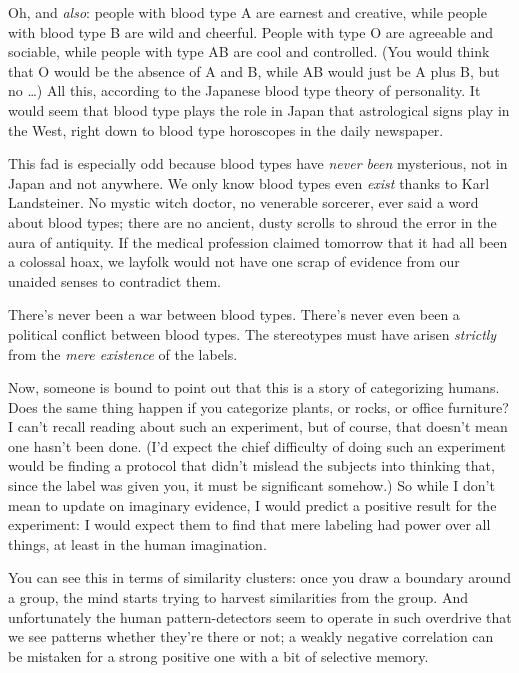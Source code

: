 {
 Oh, and \textit{also}: people with blood type A are earnest and
creative, while people with blood type B are wild and cheerful. People
with type O are agreeable and sociable, while people with type AB are
cool and controlled. (You would think that O would be the absence of A
and B, while AB would just be A plus B, but no \ldots) All this,
according to the Japanese blood type theory of personality. It would
seem that blood type plays the role in Japan that astrological signs
play in the West, right down to blood type horoscopes in the daily
newspaper.}

{
 This fad is especially odd because blood types have \textit{never
been} mysterious, not in Japan and not anywhere. We only know blood
types even \textit{exist} thanks to Karl Landsteiner. No mystic witch
doctor, no venerable sorcerer, ever said a word about blood types;
there are no ancient, dusty scrolls to shroud the error in the aura of
antiquity. If the medical profession claimed tomorrow that it had all
been a colossal hoax, we layfolk would not have one scrap of evidence
from our unaided senses to contradict them.}

{
 There's never been a war between blood types.
There's never even been a political conflict between
blood types. The stereotypes must have arisen \textit{strictly} from
the \textit{mere existence} of the labels.}

{
 Now, someone is bound to point out that this is a story of
categorizing humans. Does the same thing happen if you categorize
plants, or rocks, or office furniture? I can't recall
reading about such an experiment, but of course, that
doesn't mean one hasn't been done.
(I'd expect the chief difficulty of doing such an
experiment would be finding a protocol that didn't
mislead the subjects into thinking that, since the label was given you,
it must be significant somehow.) So while I don't mean
to update on imaginary evidence, I would predict a positive result for
the experiment: I would expect them to find that mere labeling had
power over all things, at least in the human imagination.}

{
 You can see this in terms of similarity clusters: once you draw a
boundary around a group, the mind starts trying to harvest similarities
from the group. And unfortunately the human pattern-detectors seem to
operate in such overdrive that we see patterns whether
they're there or not; a weakly negative correlation can
be mistaken for a strong positive one with a bit of selective memory.}

